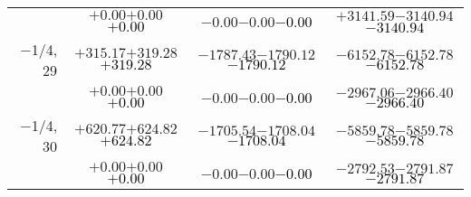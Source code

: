 \documentclass[compress]{beamer}
\begin{document}
\begin{frame}
{\begin{tabular}{r | c | c | c}
           & $+0.00$\hspace{0.1 cm}$+0.00$\hspace{0.1 cm}\textcolor{black}{$+0.00$} & $-0.00$\hspace{0.1 cm}$-0.00$\hspace{0.1 cm}\textcolor{black}{$-0.00$} & $+3141.59$\hspace{0.1 cm}$-3140.94$\hspace{0.1 cm}\textcolor{black}{$-3140.94$} \\
$-$1/4, 29 & $+315.17$\hspace{0.1 cm}$+319.28$\hspace{0.1 cm}\textcolor{black}{$+319.28$} & $-1787.43$\hspace{0.1 cm}$-1790.12$\hspace{0.1 cm}\textcolor{black}{$-1790.12$} & $-6152.78$\hspace{0.1 cm}$-6152.78$\hspace{0.1 cm}\textcolor{black}{$-6152.78$} \\
           & $+0.00$\hspace{0.1 cm}$+0.00$\hspace{0.1 cm}\textcolor{black}{$+0.00$} & $-0.00$\hspace{0.1 cm}$-0.00$\hspace{0.1 cm}\textcolor{black}{$-0.00$} & $-2967.06$\hspace{0.1 cm}$-2966.40$\hspace{0.1 cm}\textcolor{black}{$-2966.40$} \\
$-$1/4, 30 & $+620.77$\hspace{0.1 cm}$+624.82$\hspace{0.1 cm}\textcolor{black}{$+624.82$} & $-1705.54$\hspace{0.1 cm}$-1708.04$\hspace{0.1 cm}\textcolor{black}{$-1708.04$} & $-5859.78$\hspace{0.1 cm}$-5859.78$\hspace{0.1 cm}\textcolor{black}{$-5859.78$} \\
           & $+0.00$\hspace{0.1 cm}$+0.00$\hspace{0.1 cm}\textcolor{black}{$+0.00$} & $-0.00$\hspace{0.1 cm}$-0.00$\hspace{0.1 cm}\textcolor{black}{$-0.00$} & $-2792.53$\hspace{0.1 cm}$-2791.87$\hspace{0.1 cm}\textcolor{black}{$-2791.87$} \\
\end{tabular}}
\end{frame}
\end{document}
